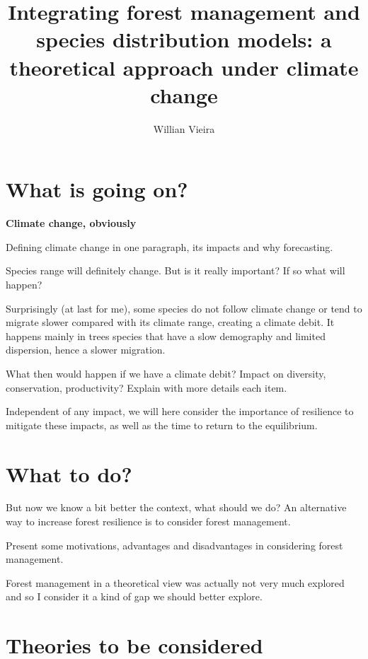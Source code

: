 \documentclass[a4paper,12pt,twoside]{article}
\begin{document}
\title{Integrating forest management and species distribution models: a theoretical approach under climate change}

\author{Willian Vieira}

\maketitle

\section{What is going on?}

\textbf{Climate change, obviously}

Defining climate change in one paragraph, its impacts and why forecasting.

Species range will definitely change. But is it really important? If so what will happen?

Surprisingly (at last for me), some species do not follow climate change or tend to migrate slower compared with its climate range, creating a climate debit. It happens mainly in trees species that have a slow demography and limited dispersion, hence a slower migration.

What then would happen if we have a climate debit? Impact on diversity, conservation, productivity? Explain with more details each item.

Independent of any impact, we will here consider the importance of resilience to mitigate these impacts, as well as the time to return to the equilibrium.

\section{What to do?}

But now we know a bit better the context, what should we do? An alternative way to increase forest resilience is to consider forest management.

Present some motivations, advantages and disadvantages in considering forest management.

Forest management in a theoretical view was actually not very much explored and so I consider it a kind of gap we should better explore.

\section{Theories to be considered}
\end{document}
